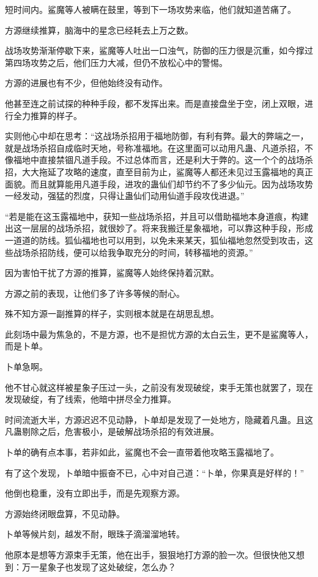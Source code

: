 \begin{this_body}
短时间内。鲨魔等人被瞒在鼓里，等到下一场攻势来临，他们就知道苦痛了。

方源继续推算，脑海中的星念已经耗去上万之数。

战场攻势渐渐停歇下来，鲨魔等人吐出一口浊气，防御的压力很是沉重，如今撑过第四场攻势之后，他们压力大减，但仍不放松心中的警惕。

方源的进展也有不少，但他始终没有动作。

他甚至连之前试探的种种手段，都不发挥出来。而是直接盘坐于空，闭上双眼，进行全力推算的样子。

实则他心中却在思考：“这战场杀招用于福地防御，有利有弊。最大的弊端之一，就是战场杀招自成临时天地，号称准福地。在这里面可以动用凡蛊、凡道杀招，不像福地中直接禁锢凡道手段。不过总体而言，还是利大于弊的。这一个个的战场杀招，大大拖延了攻略的速度，直至目前为止，鲨魔等人都还未见过玉露福地的真正面貌。而且就算能用凡道手段，进攻的蛊仙们却节约不了多少仙元。因为战场攻势一经发动，强猛的烈度，只得让蛊仙们动用仙道手段攻伐进退。”

“若是能在这玉露福地中，获知一些战场杀招，并且可以借助福地本身道痕，构建出这一层层的战场杀招，就很妙了。将来我搬迁星象福地，可以靠这种手段，形成一道道的防线。狐仙福地也可以用到，以免未来某天，狐仙福地忽然受到攻击，这些战场杀招防线，便可以给我争取充分的时间，转移福地的资源。”

因为害怕干扰了方源的推算，鲨魔等人始终保持着沉默。

方源之前的表现，让他们多了许多等候的耐心。

殊不知方源一副推算的样子，实则根本就是在胡思乱想。

此刻场中最为焦急的，不是方源，也不是担忧方源的太白云生，更不是鲨魔等人，而是卜单。

卜单急啊。

他不甘心就这样被星象子压过一头，之前没有发现破绽，束手无策也就罢了，现在发现破绽，有了线索，他暗中拼尽全力推算。

时间流逝大半，方源迟迟不见动静，卜单却是发现了一处地方，隐藏着凡蛊。且这凡蛊剔除之后，危害极小，是破解战场杀招的有效进展。

卜单的确有点本事，若非如此，鲨魔也不会一直带着他攻略玉露福地了。

有了这个发现，卜单暗中振奋不已，心中对自己道：“卜单，你果真是好样的！”

他倒也稳重，没有立即出手，而是先观察方源。

方源始终闭眼盘算，不见动静。

卜单等候片刻，越发不耐，眼珠子滴溜溜地转。

他原本是想等方源束手无策，他在出手，狠狠地打方源的脸一次。但很快他又想到：万一星象子也发现了这处破绽，怎么办？


\end{this_body}
